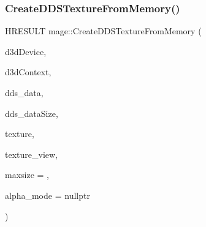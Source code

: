 \subsubsection{\texorpdfstring{Create\+D\+D\+S\+Texture\+From\+Memory()}{CreateDDSTextureFromMemory()}\hspace{0.1cm}{\footnotesize\ttfamily [2/4]}}
{\footnotesize\ttfamily H\+R\+E\+S\+U\+LT mage\+::\+Create\+D\+D\+S\+Texture\+From\+Memory (\begin{DoxyParamCaption}\item[{\+\_\+\+In\+\_\+ I\+D3\+D11\+Device $\ast$}]{d3d\+Device,  }\item[{\+\_\+\+In\+\_\+opt\+\_\+ I\+D3\+D11\+Device\+Context $\ast$}]{d3d\+Context,  }\item[{\+\_\+\+In\+\_\+reads\+\_\+bytes\+\_\+(dds\+\_\+data\+Size) const uint8\+\_\+t $\ast$}]{dds\+\_\+data,  }\item[{\+\_\+\+In\+\_\+ size\+\_\+t}]{dds\+\_\+data\+Size,  }\item[{\+\_\+\+Outptr\+\_\+opt\+\_\+ I\+D3\+D11\+Resource $\ast$$\ast$}]{texture,  }\item[{\+\_\+\+Outptr\+\_\+opt\+\_\+ I\+D3\+D11\+Shader\+Resource\+View $\ast$$\ast$}]{texture\+\_\+view,  }\item[{\+\_\+\+In\+\_\+ size\+\_\+t}]{maxsize = {},  }\item[{\+\_\+\+Out\+\_\+opt\+\_\+ \hyperlink{namespacemage_a0c586a2bad862f4858900ca121ca80c2}{D\+D\+S\+\_\+\+A\+L\+P\+H\+A\+\_\+\+M\+O\+DE} $\ast$}]{alpha\+\_\+mode = {\ttfamily nullptr} }\end{DoxyParamCaption})}

\hypertarget{namespacemage_aa3dfb149c30fcaad9aafc80a5fc06440}{}\label{namespacemage_aa3dfb149c30fcaad9aafc80a5fc06440} 
